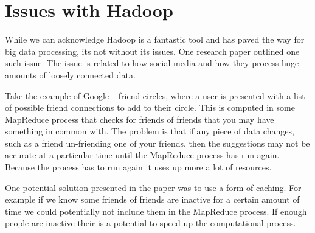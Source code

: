\section{Issues with Hadoop}

While we can acknowledge Hadoop is a fantastic tool and has paved the way for big data processing, its not without its issues. One research paper outlined one such issue\cite[pg.3]{hadoop-issues}. The issue is related to how social media and how they process huge amounts of loosely connected data. 

Take the example of Google+ friend circles, where a user is presented with a list of possible friend connections to add to their circle. This is computed in some MapReduce process that checks for friends of friends that you may have something in common with. The problem is that if any piece of data changes, such as a friend un-friending one of your friends, then the suggestions may not be accurate at a particular time until the MapReduce process has run again. Because the process has to run again it uses up more a lot of resources. 

One potential solution presented in the paper was to use a form of caching\cite[pg.3-4]{hadoop-issues}. For example if we know some friends of friends are inactive for a certain amount of time we could potentially not include them in the MapReduce process. If enough people are inactive their is a potential to speed up the computational process.